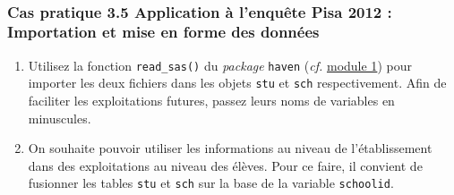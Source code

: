 \documentclass[12pt,twosided, notitlepage]{book}
\newenvironment{Shaded}{}{}
\newcommand{\CommentTok}[1]{\textcolor[rgb]{0.00,0.50,0.00}{#1}}
\newcommand{\KeywordTok}[1]{\textcolor[rgb]{0.00,0.00,1.00}{#1}}
\newcommand{\NormalTok}[1]{#1}
\newcommand{\StringTok}[1]{\textcolor[rgb]{0.00,0.50,0.50}{#1}}
\newif \ifsol
\renewenvironment{Shaded}{\begin{snugshade}}{\end{snugshade}}
\begin{document}
~

\hypertarget{cas-pratique-3.5-application-a-lenquete-pisa-2012-importation-et-mise-en-forme-des-donnees}{%
\subsubsection{\texorpdfstring{\textbf{Cas pratique 3.5} Application à
l'enquête Pisa 2012 : Importation et mise en forme des
données}{Cas pratique 3.5 Application à l'enquête Pisa 2012 : Importation et mise en forme des données}}\label{cas-pratique-3.5-application-a-lenquete-pisa-2012-importation-et-mise-en-forme-des-donnees}}


\begin{enumerate}
\def\labelenumi{\alph{enumi}.}
\item
  Utilisez la fonction \texttt{read\_sas()} du
  \emph{package} \texttt{haven} (\emph{cf.} \underline{module 1}) pour
  importer les deux fichiers dans les objets \texttt{stu} et
  \texttt{sch} respectivement. Afin de faciliter les exploitations
  futures, passez leurs noms de variables en
  minuscules.

  \ifsol 

  \begin{center} \rule{0.5\linewidth}{\linethickness}\end{center}

\begin{Shaded}
\begin{Highlighting}[]
\CommentTok{# Import des fichiers avec la fonction read_sas()}
\CommentTok{# install.packages("haven")}
\KeywordTok{library}\NormalTok{(haven)}
\NormalTok{stu <-}\StringTok{ }\KeywordTok{read_sas}\NormalTok{(}\StringTok{"pisa_stu.sas7bdat"}\NormalTok{)}
\NormalTok{sch <-}\StringTok{ }\KeywordTok{read_sas}\NormalTok{(}\StringTok{"pisa_sch.sas7bdat"}\NormalTok{)}

\CommentTok{# Passage des noms en minuscules}
\KeywordTok{names}\NormalTok{(stu) <-}\StringTok{ }\KeywordTok{tolower}\NormalTok{(}\KeywordTok{names}\NormalTok{(stu))}
\KeywordTok{names}\NormalTok{(sch) <-}\StringTok{ }\KeywordTok{tolower}\NormalTok{(}\KeywordTok{names}\NormalTok{(sch))}
\end{Highlighting}
\end{Shaded}

  \begin{center} \rule{0.5\linewidth}{\linethickness}\end{center} 
    \bigskip 
    \fi
\item
  On souhaite pouvoir utiliser les informations au niveau de
  l'établissement dans des exploitations au niveau des élèves. Pour ce
  faire, il convient de fusionner les tables \texttt{stu} et
  \texttt{sch} sur la base de la variable \texttt{schoolid}.


\end{enumerate}
\end{document}
